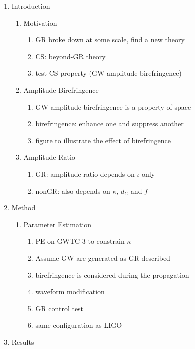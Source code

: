\documentclass[twocolumn]{aastex631}
\begin{document}
\begin{enumerate}
    \item Introduction
    \begin{enumerate}
        \item Motivation
        \begin{enumerate}
            \item GR broke down at some scale, find a new theory
            \item CS: beyond-GR theory
            \item test CS property (GW amplitude birefringence)
        \end{enumerate}
        \item Amplitude Birefringence
        \begin{enumerate}
            \item GW amplitude birefringence is a property of space
            \item birefringence: enhance one and suppress another
            \item figure to illustrate the effect of birefringence
        \end{enumerate}
        \item Amplitude Ratio
        \begin{enumerate}
            \item GR: amplitude ratio depends on $\iota$ only
            \item nonGR: also depends on $\kappa$, $d_C$ and $f$
        \end{enumerate}
    \end{enumerate}
    \item Method
    \begin{enumerate}
        \item Parameter Estimation
        \begin{enumerate}
            \item PE on GWTC-3 to constrain $\kappa$
            \item Assume GW are generated as GR described
            \item birefringence is considered during the propagation
            \item waveform modification
            \item GR control test
            \item same configuration as LIGO
        \end{enumerate}
    \end{enumerate}
    \item Results

\end{enumerate}
\end{document}
